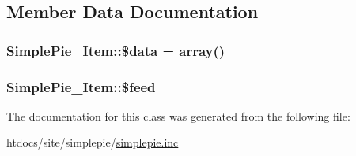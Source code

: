 \subsection{Member Data Documentation}
\hypertarget{class_simple_pie___item_a25853fcaf6a022029cfb7d7288e00871}{
\subsubsection[{\$data}]{\setlength{\rightskip}{0pt plus 5cm}Simple\-Pie\-\_\-\-Item\-::\$data = array()}}\label{class_simple_pie___item_a25853fcaf6a022029cfb7d7288e00871}
\hypertarget{class_simple_pie___item_af80f074434886c3f285fb38777225d2e}{
\subsubsection[{\$feed}]{\setlength{\rightskip}{0pt plus 5cm}Simple\-Pie\-\_\-\-Item\-::\$feed}}\label{class_simple_pie___item_af80f074434886c3f285fb38777225d2e}


The documentation for this class was generated from the following file\-:\begin{DoxyCompactItemize}
\item 
htdocs/site/simplepie/\hyperlink{simplepie_8inc}{simplepie.\-inc}\end{DoxyCompactItemize}
